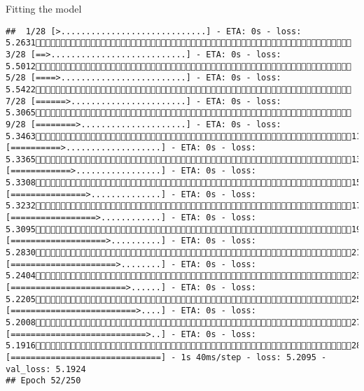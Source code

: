 \documentclass[
  ignorenonframetext,
]{beamer}
\begin{document}
\begin{frame}[fragile]{Fitting the model}
\begin{verbatim}
##  1/28 [>.............................] - ETA: 0s - loss: 5.2631 3/28 [==>...........................] - ETA: 0s - loss: 5.5012 5/28 [====>.........................] - ETA: 0s - loss: 5.5422 7/28 [======>.......................] - ETA: 0s - loss: 5.3065 9/28 [========>.....................] - ETA: 0s - loss: 5.346311/28 [==========>...................] - ETA: 0s - loss: 5.336513/28 [============>.................] - ETA: 0s - loss: 5.330815/28 [===============>..............] - ETA: 0s - loss: 5.323217/28 [=================>............] - ETA: 0s - loss: 5.309519/28 [===================>..........] - ETA: 0s - loss: 5.283021/28 [=====================>........] - ETA: 0s - loss: 5.240423/28 [=======================>......] - ETA: 0s - loss: 5.220525/28 [=========================>....] - ETA: 0s - loss: 5.200827/28 [===========================>..] - ETA: 0s - loss: 5.191628/28 [==============================] - 1s 40ms/step - loss: 5.2095 - val_loss: 5.1924
## Epoch 52/250

\end{verbatim}
\end{frame}
\end{document}
